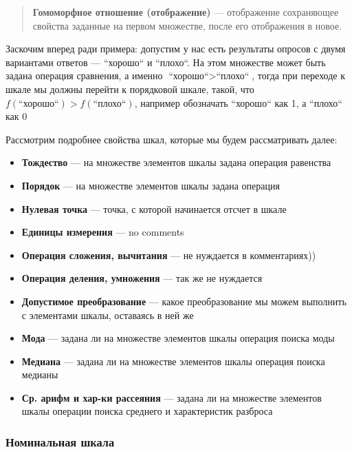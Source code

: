 \documentclass{article}
\begin{document}
    \begin{quote}
        \textbf{Гомоморфное отношение (отображение)} --- отображение сохраняющее свойства заданные на первом множестве, после его отображения в новое.
    \end{quote}

    Заскочим вперед ради примера: допустим у нас есть результаты опросов с двумя вариантами ответов --- ``хорошо`` и ``плохо``. На этом множестве может быть
    задана операция сравнения, а именно $\text{``хорошо``} > \text{``плохо``}$, тогда при переходе к шкале мы должны перейти к порядковой шкале, такой, что
    $f(\text{``хорошо``}) > f(\text{``плохо``})$, например обозначать ``хорошо`` как 1, а ``плохо`` как 0

    Рассмотрим подробнее свойства шкал, которые мы будем рассматривать далее:

    \begin{itemize}
        \item \textbf{Тождество} --- на множестве элементов шкалы задана операция равенства
        \item \textbf{Порядок} --- на множестве элементов шкалы задана операция
        \item \textbf{Нулевая точка} --- точка, с которой начинается отсчет в шкале
        \item \textbf{Единицы измерения} --- no comments
        \item \textbf{Операция сложения, вычитания} --- не нуждается в комментариях))
        \item \textbf{Операция деления, умножения} --- так же не нуждается
        \item \textbf{Допустимое преобразование} --- какое преобразование мы можем выполнить с элементами шкалы, оставаясь в ней же
        \item \textbf{Мода} --- задана ли на множестве элементов шкалы операция поиска моды
        \item \textbf{Медиана} --- задана ли на множестве элементов шкалы операция поиска медианы
        \item \textbf{Ср. арифм и хар-ки рассеяния} --- задана ли на множестве элементов шкалы операции поиска среднего и характеристик разброса
    \end{itemize}

    \subsubsection{Номинальная шкала}
\end{document}
